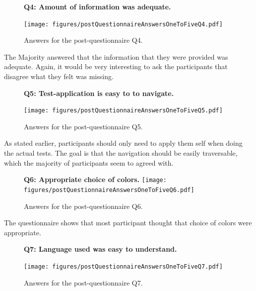 \documentclass[nofilelist,dvipsnames]{cslthse-msc}
\begin{document}
{				\begin{figure}[h!]
          \textbf{Q4: Amount of information was adequate.}
          \begin{center}
            \texttt{[image: figures/postQuestionnaireAnswersOneToFiveQ4.pdf]}
            \vspace{-1cm}
            \caption{Answers for the post-questionnaire Q4.}
          \end{center}
				\end{figure}

        The Majority answered that the information that they were provided was
        adequate. Again, it would be very interesting to ask the participants
        that disagree what they felt was missing.

				\begin{figure}[h!]
          \textbf{Q5: Test-application is easy to to navigate.}
          \begin{center}
            \texttt{[image: figures/postQuestionnaireAnswersOneToFiveQ5.pdf]}
            \vspace{-1cm}
            \caption{Answers for the post-questionnaire Q5.}
          \end{center}
				\end{figure}

        As stated earlier, participants should only need to apply them self
        when doing the actual tests. The goal is that the navigation should be
        easily traversable, which the majority of participants seem to agreed with.

				\begin{figure}[h!]
          \begin{center}
            \textbf{Q6: Appropriate choice of colors.}
            \texttt{[image: figures/postQuestionnaireAnswersOneToFiveQ6.pdf]}
            \vspace{-1cm}
            \caption{Answers for the post-questionnaire Q6.}
          \end{center}
				\end{figure}

        The questionnaire shows that most participant thought that choice of
        colors were appropriate.

				\begin{figure}[h!]
          \textbf{Q7: Language used was easy to understand.}
          \begin{center}
            \texttt{[image: figures/postQuestionnaireAnswersOneToFiveQ7.pdf]}
            \vspace{-1cm}
            \caption{Answers for the post-questionnaire Q7.}
          \end{center}
				\end{figure}

}
\end{document}
